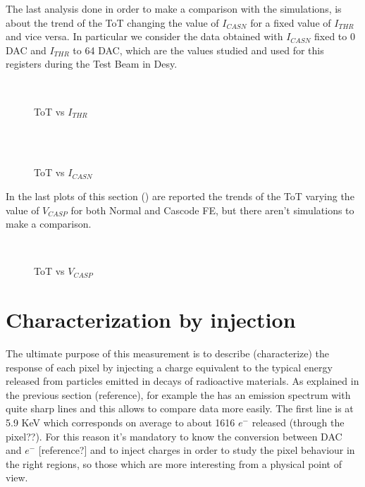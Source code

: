 The last analysis done in order to make a comparison with the simulations, is about the trend of the ToT changing the value of $I_{CASN}$ for a fixed value of $I_{THR}$ and vice versa. In particular we consider the data obtained with $I_{CASN}$ fixed to 0 DAC and $I_{THR}$ to 64 DAC, which are the values studied and used for this registers during the Test Beam in Desy.

\begin{figure}[h!]
\centering
{}\quad
{}\\
\caption{ToT vs $I_{THR}$}
\label{fig:tot_vs_ithr}
\end{figure}

\begin{figure}[h!]
\centering
{}\\%
{}\\
\caption{ToT vs $I_{CASN}$}
\label{fig:tot_vs_icasn}
\end{figure}


In the last plots of this section () are reported the trends of the ToT varying the value of $V_{CASP}$ for both Normal and Cascode FE, but there aren't simulations to make a comparison. 

\begin{figure}[h!]
\centering
{}\quad
{}\\
\caption{ToT vs $V_{CASP}$}
\label{fig:tot_vs_vcasp}
\end{figure}



\section{Characterization by injection}

The ultimate purpose of this measurement is to describe (characterize) the response of each pixel by injecting a charge equivalent to the typical energy released from particles emitted in decays of radioactive materials. As explained in the previous section (reference), for example the  has an emission spectrum with quite sharp lines and this allows to compare data more easily. The first line is at 5.9 KeV which corresponds on average to about 1616 $e^{-}$ released (through the pixel??).
For this reason it's mandatory to know the conversion between DAC and $e^{-}$ [reference?] and to inject charges in order to study the pixel behaviour in the right regions, so those which are more interesting from a physical point of view.

